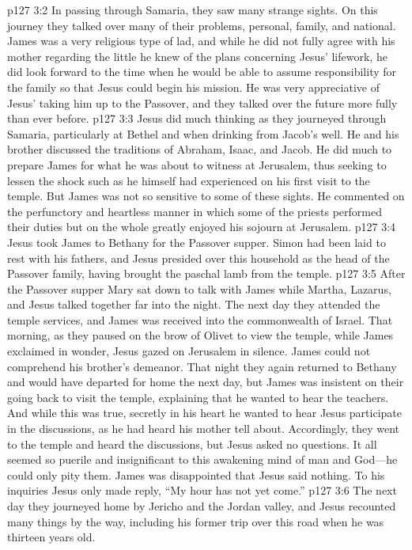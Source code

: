 \vs p127 3:2 In passing through Samaria, they saw many strange sights. On this journey they talked over many of their problems, personal, family, and national. James was a very religious type of lad, and while he did not fully agree with his mother regarding the little he knew of the plans concerning Jesus’ lifework, he did look forward to the time when he would be able to assume responsibility for the family so that Jesus could begin his mission. He was very appreciative of Jesus’ taking him up to the Passover, and they talked over the future more fully than ever before.
\vs p127 3:3 Jesus did much thinking as they journeyed through Samaria, particularly at Bethel and when drinking from Jacob’s well. He and his brother discussed the traditions of Abraham, Isaac, and Jacob. He did much to prepare James for what he was about to witness at Jerusalem, thus seeking to lessen the shock such as he himself had experienced on his first visit to the temple. But James was not so sensitive to some of these sights. He commented on the perfunctory and heartless manner in which some of the priests performed their duties but on the whole greatly enjoyed his sojourn at Jerusalem.
\vs p127 3:4 Jesus took James to Bethany for the Passover supper. Simon had been laid to rest with his fathers, and Jesus presided over this household as the head of the Passover family, having brought the paschal lamb from the temple.
\vs p127 3:5 After the Passover supper Mary sat down to talk with James while Martha, Lazarus, and Jesus talked together far into the night. The next day they attended the temple services, and James was received into the commonwealth of Israel. That morning, as they paused on the brow of Olivet to view the temple, while James exclaimed in wonder, Jesus gazed on Jerusalem in silence. James could not comprehend his brother’s demeanor. That night they again returned to Bethany and would have departed for home the next day, but James was insistent on their going back to visit the temple, explaining that he wanted to hear the teachers. And while this was true, secretly in his heart he wanted to hear Jesus participate in the discussions, as he had heard his mother tell about. Accordingly, they went to the temple and heard the discussions, but Jesus asked no questions. It all seemed so puerile and insignificant to this awakening mind of man and God---he could only pity them. James was disappointed that Jesus said nothing. To his inquiries Jesus only made reply, \textcolor{ubdarkred}{“My hour has not yet come.”}
\vs p127 3:6 The next day they journeyed home by Jericho and the Jordan valley, and Jesus recounted many things by the way, including his former trip over this road when he was thirteen years old.
